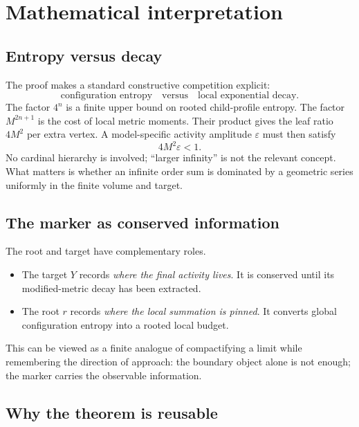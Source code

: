 \documentclass[11pt]{article}
\begin{document}
\section{Mathematical interpretation}

\subsection{Entropy versus decay}

The proof makes a standard constructive competition explicit:
\[
  \text{configuration entropy}
  \quad\text{versus}\quad
  \text{local exponential decay}.
\]
The factor $4^n$ is a finite upper bound on rooted child-profile entropy.  The factor $M^{2n+1}$ is the cost of local metric moments.  Their product gives the leaf ratio $4M^2$ per extra vertex.  A model-specific activity amplitude $\varepsilon$ must then satisfy
\[
  4M^2\varepsilon<1.
\]
No cardinal hierarchy is involved; ``larger infinity'' is not the relevant concept.  What matters is whether an infinite order sum is dominated by a geometric series uniformly in the finite volume and target.

\subsection{The marker as conserved information}

The root and target have complementary roles.
\begin{itemize}[leftmargin=2em]
  \item The target $Y$ records \emph{where the final activity lives}.  It is conserved until its modified-metric decay has been extracted.
  \item The root $r$ records \emph{where the local summation is pinned}.  It converts global configuration entropy into a rooted local budget.
\end{itemize}
This can be viewed as a finite analogue of compactifying a limit while remembering the direction of approach: the boundary object alone is not enough; the marker carries the observable information.

\subsection{Why the theorem is reusable}
\end{document}
